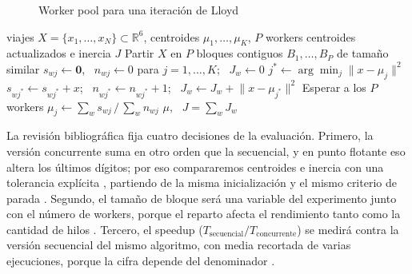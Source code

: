 \begin{figure}[H]
\caption{Worker pool para una iteración de Lloyd}\label{fig:workerpool}
\centering
\small

\end{figure}

\begin{algorithm}[tbp]
\caption{Una iteración de Lloyd con worker pool y acumuladores privados}\label{alg:lloyd}
\begin{algorithmic}[1]
\Require viajes $X = \{x_1, \dots, x_N\} \subset \mathbb{R}^6$, centroides $\mu_1, \dots, \mu_K$,
         $P$ workers
\Ensure centroides actualizados e inercia $J$
\State Partir $X$ en $P$ bloques contiguos $B_1, \dots, B_P$ de tamaño similar
 
  \State $s_{wj} \gets \mathbf{0}$, \ $n_{wj} \gets 0$ para $j = 1, \dots, K$; \ $J_w \gets 0$
    \State $j^{*} \gets \arg\min_j \lVert x - \mu_j \rVert^2$
    \State $s_{wj^{*}} \gets s_{wj^{*}} + x$; \ $n_{wj^{*}} \gets n_{wj^{*}} + 1$;
           \ $J_w \gets J_w + \lVert x - \mu_{j^{*}} \rVert^2$
  \EndFor
\EndFor
\State Esperar a los $P$ workers 
    \State $\mu_j \gets \sum_w s_{wj} \,/\, \sum_w n_{wj}$ 
  \EndIf
\EndFor
\State \Return $\mu$, \ $J = \sum_w J_w$
\end{algorithmic}
\end{algorithm}

La revisión bibliográfica fija cuatro decisiones de la evaluación. Primero, la versión concurrente
suma en otro orden que la secuencial, y en punto flotante eso altera los últimos dígitos; por eso
compararemos centroides e inercia con una tolerancia explícita \parencite{he2022}, partiendo de la
misma inicialización y el mismo criterio de parada \parencite{nigro2022}. Segundo, el tamaño de
bloque será una variable del experimento junto con el número de workers, porque el reparto afecta
el rendimiento tanto como la cantidad de hilos \parencite{kwedlo2021,kwedlo2024}. Tercero, el
speedup ($T_{\text{secuencial}} / T_{\text{concurrente}}$) se medirá contra la versión secuencial
del mismo algoritmo, con media recortada de varias ejecuciones, porque la cifra depende del
denominador \parencite{bellavita2025}.

